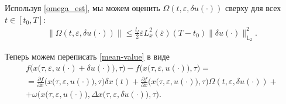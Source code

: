 \documentclass[../main.tex]{subfiles}
\begin{document}
Используя \eqref{omega_est}, мы можем оценить $\Omega(t,\varepsilon, \delta u(\cdot)) $ сверху для всех $t \in [t_0, T]$:
\begin{gather}
 \| \Omega(t,\varepsilon, \delta u(\cdot))\| \leqslant \frac{l_f}{2} \overline{\varepsilon} L_x^2(\overline{\varepsilon})(T-t_0)\|\delta u(\cdot)\|_{\mathbb{L}_2}^2.
\end{gather}

Теперь можем переписать \eqref{mean-value} в виде
\begin{gather*}
 f\Big(x\big(\tau,\varepsilon, u(\cdot) + \delta u(\cdot)\big),\tau\Big) -
 f\Big(x\big(\tau,\varepsilon, u(\cdot)\big),\tau\Big) = \\ =
 \frac{\partial f}{\partial x} \Big(x\big(\tau,\varepsilon, u(\cdot)\big), \tau\Big) \delta x(t) + 
 \frac{\partial f}{\partial x} \Big(x\big(\tau,\varepsilon, u(\cdot)\big), \tau\Big) \Omega(t,\varepsilon, \delta u(\cdot))
 + \\ + 
 \omega\Big(x\big(\tau,\varepsilon, u(\cdot)\big),\Delta x\big(\tau, \varepsilon, \delta u(\cdot)\big),\tau\Big).
\end{gather*}
\end{document}
